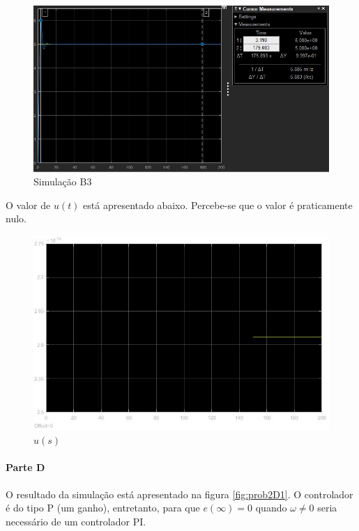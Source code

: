\documentclass[
]{book}
\theoremstyle{definition}
\theoremstyle{definition}
\theoremstyle{definition}
\theoremstyle{remark}
\begin{document}
\begin{figure}

{\centering \includegraphics[width=0.8\linewidth]{Imagens/Lab5/Resolução/prob2C1} 

}

\caption{Simulação B3}\label{fig:prob2C1}
\end{figure}

O valor de \(u(t)\) está apresentado abaixo. Percebe-se que o valor é praticamente nulo.

\begin{figure}

{\centering \includegraphics[width=0.8\linewidth]{Imagens/Lab5/Resolução/prob2C2} 

}

\caption{$u(s)$}\label{fig:prob2C2}
\end{figure}

\hypertarget{parte-d-1}{%
\paragraph*{Parte D}\label{parte-d-1}}

O resultado da simulação está apresentado na figura \ref{fig:prob2D1}. O controlador é do tipo P (um ganho), entretanto, para que \(e(\infty) = 0\) quando \(\omega \neq0\) seria necessário de um controlador PI.
\end{document}
